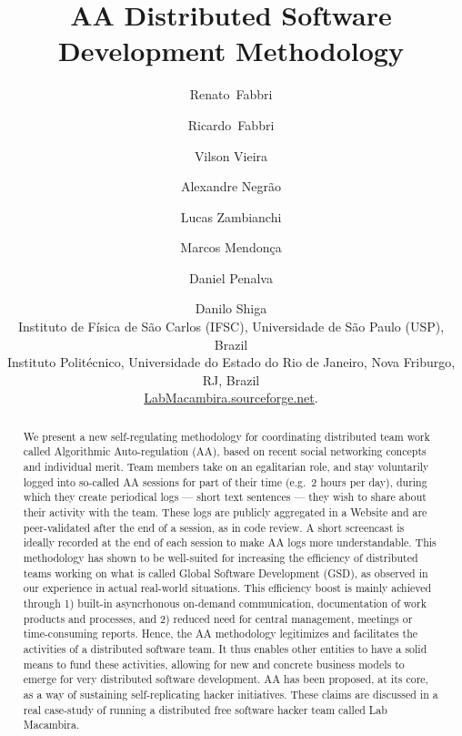 \title{
AA Distributed Software Development Methodology
}

\author{%
Renato~Fabbri \and Ricardo~Fabbri \and Vilson Vieira \and Alexandre Negr\~{a}o \and Lucas Zambianchi
\and Marcos Mendon\c{c}a \and Daniel Penalva \and Danilo Shiga\\[1em]
\small{
Instituto de F\'{i}sica de S\~{a}o Carlos (IFSC), Universidade de
S\~{a}o Paulo (USP), Brazil}\\[0.5em]
\small{Instituto Polit\'{e}cnico, Universidade do Estado do Rio de
Janeiro, Nova Friburgo, RJ, Brazil}\\[0.5em]
\url{LabMacambira.sourceforge.net}.
}


\maketitle

\begin{abstract}
We present a new self-regulating methodology for coordinating distributed team
work called Algorithmic Auto-regulation (AA), based on recent social networking
concepts and individual merit. Team members take on an egalitarian role, and
stay voluntarily logged into so-called AA sessions for part of their time (e.g.\
2 hours per day), during which they create periodical logs --- short text
sentences --- they wish to share about their activity with the team. These logs
are publicly aggregated in a Website and are peer-validated after the end of a
session, as in code review.  A short screencast is ideally recorded at the end
of each session to make AA logs more understandable.  This methodology has shown
to be well-suited for increasing the efficiency of distributed teams working on
what is called Global Software Development (GSD), as observed in our experience
in actual real-world situations.  This efficiency boost is mainly achieved through 1)
built-in asyncrhonous on-demand communication, documentation of work products
and processes, and 2) reduced need for central management, meetings or
time-consuming reports. Hence, the AA methodology legitimizes and facilitates
the activities of a distributed software team.  It thus enables other entities
to have a solid means to fund these activities, allowing for new and concrete
business models to emerge for very distributed software development. AA has been
proposed, at its core, as a way of sustaining self-replicating hacker
initiatives. These claims are discussed in a real case-study of running a
distributed free software hacker team called Lab Macambira.  
\end{abstract}
